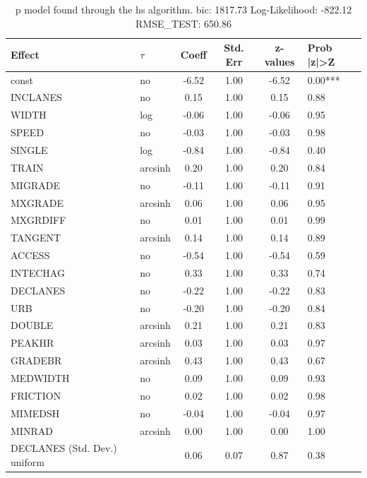 \begin{table}
	\caption{p model found through the hs algorithm. bic: 1817.73 Log-Likelihood: -822.12 RMSE_TEST: 650.86}
	\begin{center}
		\begin{tabular}{|l|l|c|c|c|l|}
			\hline
			Effect & $\tau$ & Coeff & Std. Err & z-values & Prob |z|>Z \\
			\hline
			const & no & -6.52 & 1.00 & -6.52 & 0.00*** \\
			\hline
			INCLANES & no & 0.15 & 1.00 & 0.15 & 0.88 \\
			\hline
			WIDTH & log & -0.06 & 1.00 & -0.06 & 0.95 \\
			\hline
			SPEED & no & -0.03 & 1.00 & -0.03 & 0.98 \\
			\hline
			SINGLE & log & -0.84 & 1.00 & -0.84 & 0.40 \\
			\hline
			TRAIN & arcsinh & 0.20 & 1.00 & 0.20 & 0.84 \\
			\hline
			MIGRADE & no & -0.11 & 1.00 & -0.11 & 0.91 \\
			\hline
			MXGRADE & arcsinh & 0.06 & 1.00 & 0.06 & 0.95 \\
			\hline
			MXGRDIFF & no & 0.01 & 1.00 & 0.01 & 0.99 \\
			\hline
			TANGENT & arcsinh & 0.14 & 1.00 & 0.14 & 0.89 \\
			\hline
			ACCESS & no & -0.54 & 1.00 & -0.54 & 0.59 \\
			\hline
			INTECHAG & no & 0.33 & 1.00 & 0.33 & 0.74 \\
			\hline
			DECLANES & no & -0.22 & 1.00 & -0.22 & 0.83 \\
			\hline
			URB & no & -0.20 & 1.00 & -0.20 & 0.84 \\
			\hline
			DOUBLE & arcsinh & 0.21 & 1.00 & 0.21 & 0.83 \\
			\hline
			PEAKHR & arcsinh & 0.03 & 1.00 & 0.03 & 0.97 \\
			\hline
			GRADEBR & arcsinh & 0.43 & 1.00 & 0.43 & 0.67 \\
			\hline
			MEDWIDTH & no & 0.09 & 1.00 & 0.09 & 0.93 \\
			\hline
			FRICTION & no & 0.02 & 1.00 & 0.02 & 0.98 \\
			\hline
			MIMEDSH & no & -0.04 & 1.00 & -0.04 & 0.97 \\
			\hline
			MINRAD & arcsinh & 0.00 & 1.00 & 0.00 & 1.00 \\
			\hline
			DECLANES (Std. Dev.) uniform &  & 0.06 & 0.07 & 0.87 & 0.38 \\

\end{tabular}
\end{center}
\end{table}
